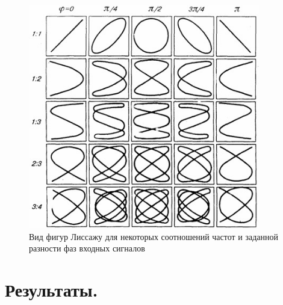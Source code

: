 \documentclass[12pt,a4paper]{article}
\begin{document}
	\begin{figure}
		\begin{center}
			\includegraphics[width = 0.9\textwidth]{Lissaju_figure_modificed}
			\caption{Вид фигур Лиссажу для некоторых соотношений частот и заданной разности фаз входных сигналов}
			\label{fig:Lissajг_figure}
		\end{center}
	\end{figure}
	
\newpage


\section{Результаты.}
\end{document}

